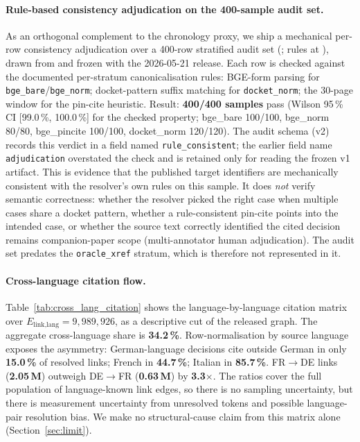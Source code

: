 \documentclass[11pt,a4paper]{article}
\begin{document}
\paragraph{Rule-based consistency adjudication on the 400-sample audit set.} As an orthogonal complement to the chronology proxy, we ship a mechanical per-row consistency adjudication over a 400-row stratified audit set (; rules at ), drawn from and frozen with the 2026-05-21 release. Each row is checked against the documented per-stratum canonicalisation rules: BGE-form parsing for \texttt{bge\_bare}/\texttt{bge\_norm}; docket-pattern suffix matching for \texttt{docket\_norm}; the 30-page window for the pin-cite heuristic. Result: \textbf{400/400 samples} pass (Wilson 95\,\% CI [99.0\,\%, 100.0\,\%] for the checked property; bge\_bare 100/100, bge\_norm 80/80, bge\_pincite 100/100, docket\_norm 120/120). The audit schema (v2) records this verdict in a field named \texttt{rule\_consistent}; the earlier field name \texttt{adjudication} overstated the check and is retained only for reading the frozen v1 artifact. This is evidence that the published target identifiers are mechanically consistent with the resolver's own rules on this sample. It does \emph{not} verify semantic correctness: whether the resolver picked the right case when multiple cases share a docket pattern, whether a rule-consistent pin-cite points into the intended case, or whether the source text correctly identified the cited decision remains companion-paper scope (multi-annotator human adjudication). The audit set predates the \texttt{oracle\_xref} stratum, which is therefore not represented in it.

\paragraph{Cross-language citation flow.} Table~\ref{tab:cross_lang_citation} shows the language-by-language citation matrix over $E_{\textrm{link,lang}} = 9{,}989{,}926$, as a descriptive cut of the released graph. The aggregate cross-language share is \textbf{34.2\,\%}. Row-normalisation by source language exposes the asymmetry: German-language decisions cite outside German in only \textbf{15.0\,\%} of resolved links; French in \textbf{44.7\,\%}; Italian in \textbf{85.7\,\%}. FR$\to$DE links (\textbf{2.05\,M}) outweigh DE$\to$FR (\textbf{0.63\,M}) by \textbf{3.3$\times$}. The ratios cover the full population of language-known link edges, so there is no sampling uncertainty, but there is measurement uncertainty from unresolved tokens and possible language-pair resolution bias. We make no structural-cause claim from this matrix alone (Section~\ref{sec:limit}).
\end{document}
